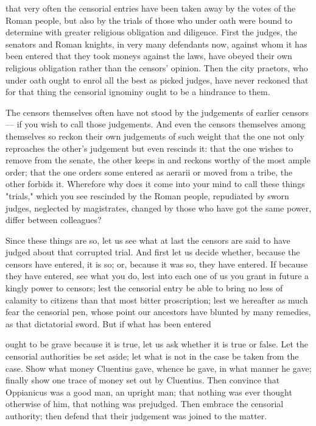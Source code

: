  that very often the censorial entries have been taken away by the votes of the Roman people, but also by the trials of those who under oath were bound to determine with greater religious obligation and diligence. First the judges, the senators and Roman knights, in very many defendants now, against whom it has been entered that they took moneys against the laws, have obeyed their own religious obligation rather than the censors' opinion. Then the city praetors, who under oath ought to enrol all the best as picked judges, have never reckoned that for that thing the censorial ignominy ought to be a hindrance to them.

 The censors themselves often have not stood by the judgements of earlier censors --- if you wish to call those judgements. And even the censors themselves among themselves so reckon their own judgements of such weight that the one not only reproaches the other's judgement but even rescinds it: that the one wishes to remove from the senate, the other keeps in and reckons worthy of the most ample order; that the one orders some entered as aerarii or moved from a tribe, the other forbids it. Wherefore why does it come into your mind to call these things "trials," which you see rescinded by the Roman people, repudiated by sworn judges, neglected by magistrates, changed by those who have got the same power, differ between colleagues?

 Since these things are so, let us see what at last the censors are said to have judged about that corrupted trial. And first let us decide whether, because the censors have entered, it is so; or, because it was so, they have entered. If because they have entered, see what you do, lest into each one of us you grant in future a kingly power to censors; lest the censorial entry be able to bring no less of calamity to citizens than that most bitter proscription; lest we hereafter as much fear the censorial pen, whose point our ancestors have blunted by many remedies, as that dictatorial sword. But if what has been entered

 ought to be grave because it is true, let us ask whether it is true or false. Let the censorial authorities be set aside; let what is not in the case be taken from the case. Show what money Cluentius gave, whence he gave, in what manner he gave; finally show one trace of money set out by Cluentius. Then convince that Oppianicus was a good man, an upright man; that nothing was ever thought otherwise of him, that nothing was prejudged. Then embrace the censorial authority; then defend that their judgement was joined to the matter.

